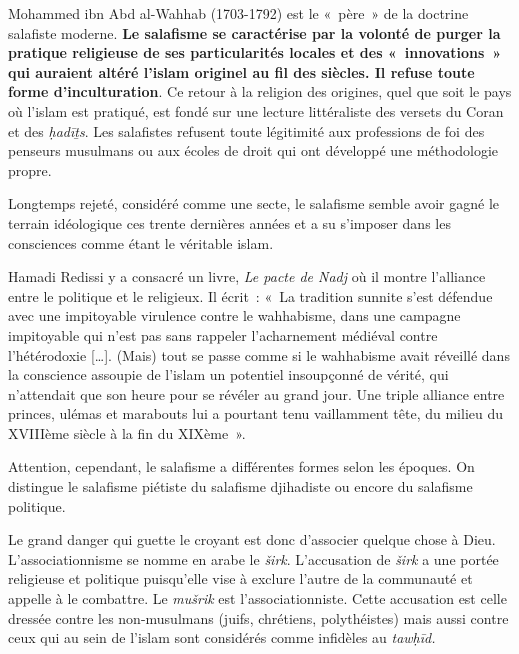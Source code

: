 Mohammed ibn Abd al-Wahhab (1703-1792) est le «~père~» de la doctrine
salafiste moderne. \textbf{Le salafisme se caractérise par la volonté de
purger la pratique religieuse de ses particularités locales et des
«~innovations~» qui auraient altéré l'islam originel au fil des
siècles}\textbf{. Il refuse toute forme d'inculturation}. Ce retour à la
religion des origines, quel que soit le pays où l'islam est pratiqué,
est fondé sur une lecture littéraliste des versets du Coran et des
\emph{ḥadīṯs}. Les salafistes refusent toute légitimité aux professions
de foi des penseurs musulmans ou aux écoles de droit qui ont développé
une méthodologie propre.

Longtemps rejeté, considéré comme une secte, le salafisme semble avoir
gagné le terrain idéologique ces trente dernières années et a su
s'imposer dans les consciences comme étant le véritable islam.

Hamadi Redissi y a consacré un livre, \emph{Le pacte de Nadj} où il
montre l'alliance entre le politique et le religieux. Il écrit~: «~La
tradition sunnite s'est défendue avec une impitoyable virulence contre
le wahhabisme, dans une campagne impitoyable qui n'est pas sans rappeler
l'acharnement médiéval contre l'hétérodoxie {[}\ldots{]}. (Mais) tout se
passe comme si le wahhabisme avait réveillé dans la conscience assoupie
de l'islam un potentiel insoupçonné de vérité, qui n'attendait que son
heure pour se révéler au grand jour. Une triple alliance entre princes,
ulémas et marabouts lui a pourtant tenu vaillamment tête, du milieu du
XVIIIème siècle à la fin du XIXème~».

Attention, cependant, le salafisme a différentes formes selon les
époques. On distingue le salafisme piétiste du salafisme djihadiste ou
encore du salafisme politique.


Le grand danger qui guette le croyant est donc d'associer quelque chose
à Dieu. L'associationnisme se nomme en arabe le \emph{širk}.
L'accusation de \emph{širk} a une portée religieuse et politique
puisqu'elle vise à exclure l'autre de la communauté et appelle à le
combattre. Le \emph{mušrik} est l'associationniste. Cette accusation est
celle dressée contre les non-musulmans (juifs, chrétiens, polythéistes)
mais aussi contre ceux qui au sein de l'islam sont considérés comme
infidèles au \emph{tawḥīd.}


